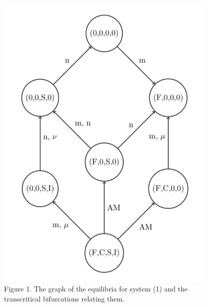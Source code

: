 \documentclass[
  letterpaper,
  DIV=11,
  numbers=noendperiod]{scrartcl}
\begin{document}
\begin{figure}[H]

{\centering \includegraphics[width=4.16667in,height=\textheight]{images/DP_foxes.png}

}

\caption{Figure 1. The graph of the equilibria for system (1) and the
transcritical bifurcations relating them.}

\end{figure}%
\end{document}
